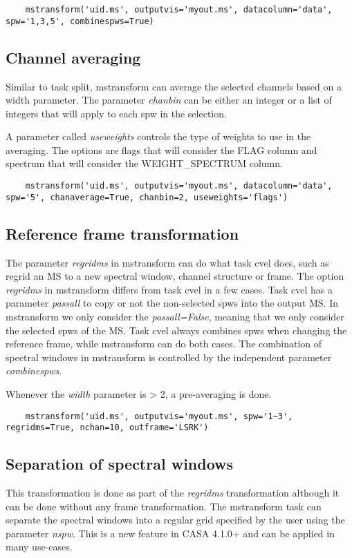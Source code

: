 \begin{verbatim}
    mstransform('uid.ms', outputvis='myout.ms', datacolumn='data', spw='1,3,5', combinespws=True)
\end{verbatim}

\subsection{Channel averaging}
Similar to task split, mstransform can average the selected channels based on a
width parameter. The parameter {\it chanbin} can be either an integer or a list of
integers that will apply to each spw in the selection.

A parameter called {\it useweights} controls the type of weights to use in the
averaging. The options are flags that will consider the FLAG column and spectrum
that will consider the WEIGHT_SPECTRUM column.

\begin{verbatim}
    mstransform('uid.ms', outputvis='myout.ms', datacolumn='data', spw='5', chanaverage=True, chanbin=2, useweights='flags')
\end{verbatim}

\subsection{Reference frame transformation}
The parameter {\it regridms} in mstransform can do what task cvel does, such as
regrid an MS to a new spectral window, channel structure or frame. The option {\it regridms}
in mstransform differs from task cvel in a few cases. Task cvel has a
parameter {\it passall} to copy or not the non-selected spws into the output MS. In 
mstransform we only consider the {\it passall=False}, meaning that we only consider the
selected spws of the MS. Task cvel always combines spws when changing the reference
frame, while mstransform can do both cases. The combination of spectral windows in mstransform
is controlled by the independent parameter {\it combinespws}.

Whenever the {\it width} parameter is > 2, a pre-averaging is done. 

\begin{verbatim}
    mstransform('uid.ms', outputvis='myout.ms', spw='1~3', regridms=True, nchan=10, outframe='LSRK')
\end{verbatim}

\subsection{Separation of spectral windows}
This transformation is done as part of the {\it regridms} transformation
although it can be done without any frame transformation. The mstransform
task can separate the spectral windows into a regular grid specified by the
user using the parameter {\it nspw}. This is a new feature in CASA
4.1.0+ and can be applied in many use-cases. %

